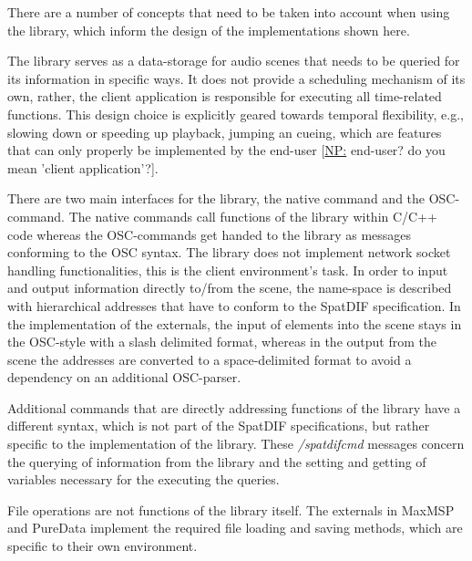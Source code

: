 \documentclass{article}
\newcommand{\np}[1]{\noindent\textcolor{carrotorange}{[\underline{NP:} #1]}}
\begin{document}
There are a number of concepts that need to be taken into account when using the library, which inform the design of the implementations shown here.

The library serves as a data-storage for audio scenes that needs to be queried for its information in specific ways.
It does not provide a scheduling mechanism of its own, rather, the client application is responsible for executing all time-related functions.
This design choice is explicitly geared towards temporal flexibility, e.g., slowing down or speeding up playback, jumping an cueing, which are features that can only properly be implemented by the end-user \np{end-user? do you mean 'client application'?}.

There are two main interfaces for the library, the native command and the OSC-command.
The native commands call functions of the library within C/C++ code whereas the OSC-commands get handed to the library as messages conforming to the OSC syntax.
The library does not implement network socket handling functionalities, this is the client environment's task.
In order to input and output information directly to/from the scene, the name-space is described with hierarchical addresses that have to conform to the SpatDIF specification.
In the implementation of the externals, the input of elements into the scene stays in the OSC-style with a slash delimited format, whereas in the output from the scene the addresses are converted to a space-delimited format to avoid a dependency on an additional OSC-parser.

Additional commands that are directly addressing functions of the library have a different syntax, which is not part of the SpatDIF specifications, but rather specific to the implementation of the library.
These \emph{/spatdifcmd} messages concern the querying of information from the library and the setting and getting of variables necessary for the executing the queries.

File operations are not functions of the library itself.
The externals in MaxMSP and PureData implement the required file loading and saving methods, which are specific to their own environment. 
 
\end{document}
